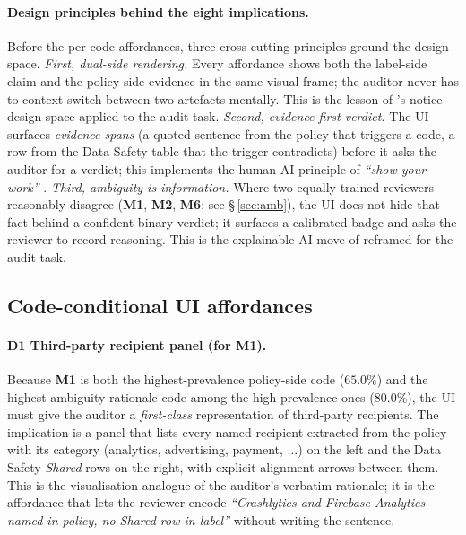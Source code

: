 \documentclass[11pt,a4paper]{article}
\newcommand{\code}[1]{\textsf{\textbf{#1}}}
\begin{document}
\paragraph{Design principles behind the eight implications.}
Before the per-code affordances, three cross-cutting principles
ground the design space. \emph{First, dual-side rendering.} Every
affordance shows both the label-side claim and the policy-side
evidence in the same visual frame; the auditor never has to
context-switch between two artefacts mentally. This is the lesson of
\citet{schaub2015design}'s notice design space applied to the
audit task. \emph{Second, evidence-first verdict.} The UI surfaces
\emph{evidence spans} (a quoted sentence from the policy that triggers
a code, a row from the Data Safety table that the trigger
contradicts) before it asks the auditor for a verdict; this implements
the human-AI principle of \emph{``show your work''}
\citep{amershi2019guidelines}. \emph{Third, ambiguity is information.}
Where two equally-trained reviewers reasonably disagree (\code{M1},
\code{M2}, \code{M6}; see \S\,\ref{sec:amb}), the UI does not hide
that fact behind a confident binary verdict; it surfaces a calibrated
badge and asks the reviewer to record reasoning. This is the
explainable-AI move of \citet{liao2020questioning} reframed for the
audit task.

\subsection{Code-conditional UI affordances}

\paragraph{\textbf{D1} Third-party recipient panel (for \code{M1}).}
Because \code{M1} is both the highest-prevalence policy-side code
($65.0\%$) and the highest-ambiguity rationale code among the
high-prevalence ones ($80.0\%$), the UI must give the auditor a
\emph{first-class} representation of third-party recipients. The
implication is a panel that lists every named recipient extracted
from the policy with its category (analytics, advertising, payment,
$\dots$) on the left and the Data Safety \textsl{Shared} rows on the
right, with explicit alignment arrows between them. This is the
visualisation analogue of the auditor's verbatim rationale; it is
the affordance that lets the reviewer encode \emph{``Crashlytics and
Firebase Analytics named in policy, no Shared row in label''}
without writing the sentence.
\end{document}
